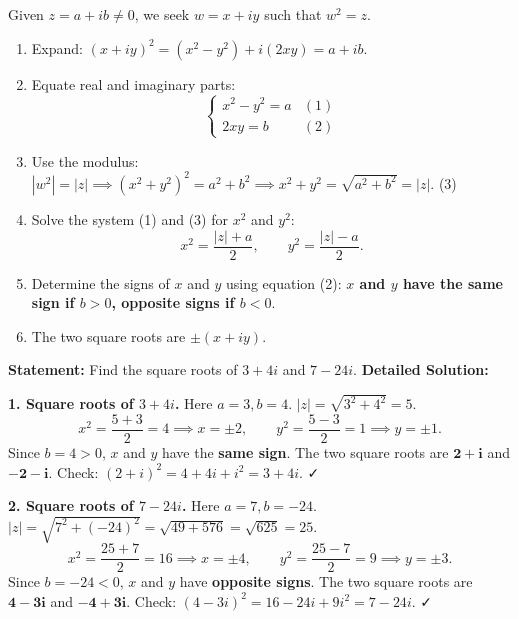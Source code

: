 \documentclass[11pt]{article}
\begin{document}
\begin{methode}
Given $z = a+ib \neq 0$, we seek $w = x+iy$ such that $w^2 = z$.
\begin{enumerate}
    \item Expand: $(x+iy)^2 = (x^2 - y^2) + i(2xy) = a + ib$.
    \item Equate real and imaginary parts:
    \[
    \begin{cases}
    x^2 - y^2 = a & (1)\\
    2xy = b & (2)
    \end{cases}
    \]
    \item Use the modulus: $|w^2| = |z| \implies (x^2+y^2)^2 = a^2+b^2 \implies x^2+y^2 = \sqrt{a^2+b^2} = |z|$. \quad (3)
    \item Solve the system (1) and (3) for $x^2$ and $y^2$:
    \[
    x^2 = \frac{|z| + a}{2}, \qquad y^2 = \frac{|z| - a}{2}.
    \]
    \item Determine the signs of $x$ and $y$ using equation (2): \textbf{$x$ and $y$ have the same sign if $b>0$, opposite signs if $b<0$}.
    \item The two square roots are $\pm(x+iy)$.
\end{enumerate}
\end{methode}

\begin{exoresolu}
\textbf{Statement:} Find the square roots of $3+4i$ and $7-24i$.
\tcblower
\textbf{Detailed Solution:}

\textbf{1. Square roots of $3+4i$.}
Here $a=3, b=4$. $|z| = \sqrt{3^2+4^2} = 5$.
\[
x^2 = \frac{5+3}{2} = 4 \implies x = \pm 2, \qquad
y^2 = \frac{5-3}{2} = 1 \implies y = \pm 1.
\]
Since $b=4 > 0$, $x$ and $y$ have the \textbf{same sign}.
The two square roots are $\mathbf{2+i}$ and $\mathbf{-2-i}$.
Check: $(2+i)^2 = 4 + 4i + i^2 = 3+4i$. ✓

\textbf{2. Square roots of $7-24i$.}
Here $a=7, b=-24$. $|z| = \sqrt{7^2+(-24)^2} = \sqrt{49+576} = \sqrt{625} = 25$.
\[
x^2 = \frac{25+7}{2} = 16 \implies x = \pm 4, \qquad
y^2 = \frac{25-7}{2} = 9 \implies y = \pm 3.
\]
Since $b=-24 < 0$, $x$ and $y$ have \textbf{opposite signs}.
The two square roots are $\mathbf{4-3i}$ and $\mathbf{-4+3i}$.
Check: $(4-3i)^2 = 16 - 24i + 9i^2 = 7-24i$. ✓
\end{exoresolu}
\end{document}
